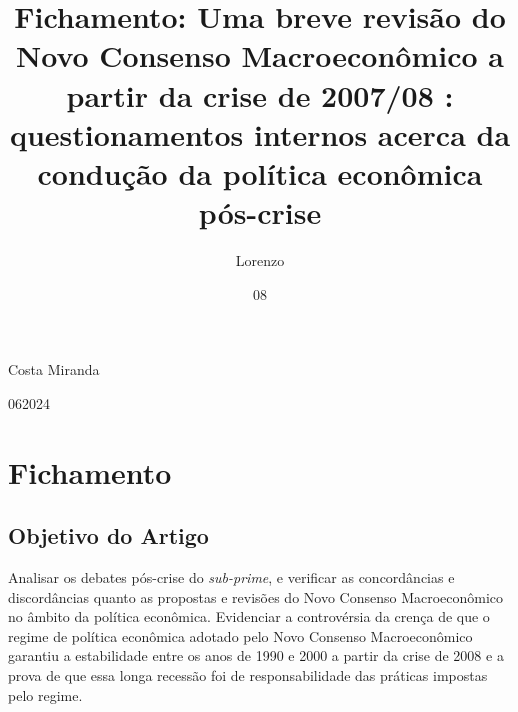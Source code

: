 \documentclass[report]{uftex}
\newcommand\uftex{UF\TeX}
\begin{document}
  \title{Fichamento: Uma breve
  	revisão do Novo Consenso Macroeconômico
  	a partir da crise de 2007/08 : questionamentos internos
  	acerca da condução da política econômica pós-crise}
  \author{Lorenzo}{Costa Miranda}
  \date{08}{06}{2024}
  \keyword{\LaTeX}
  \keyword{\uftex}
  \foreignkeyword{\LaTeX}
  \foreignkeyword{\uftex}
  \maketitle

  \frontmatter

  \printlosymbols  
  \printloabbreviations
 
\mainmatter
\onehalfspacing
\chapter{Fichamento}

\section{Objetivo do Artigo}

Analisar os debates pós-crise do \textit{sub-prime}, e verificar as concordâncias e discordâncias quanto as propostas e revisões do Novo Consenso Macroeconômico no âmbito da política econômica. Evidenciar a controvérsia da crença de que o regime de política econômica adotado pelo Novo Consenso Macroeconômico garantiu a estabilidade entre os anos de 1990 e 2000 a partir da crise de 2008 e a prova de que essa longa recessão foi de responsabilidade das práticas impostas pelo regime.
\end{document}
